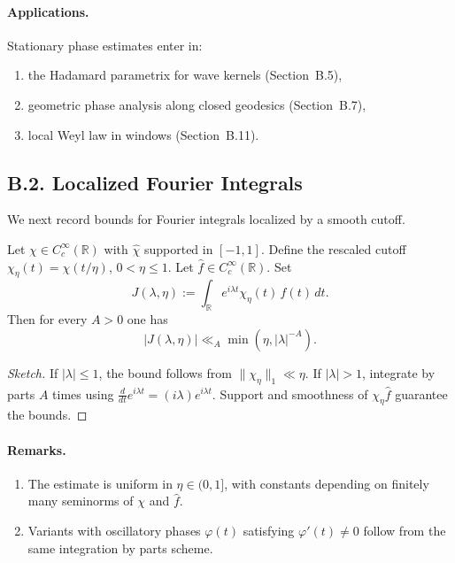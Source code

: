 \paragraph{Applications.}
Stationary phase estimates enter in:
\begin{enumerate}
  \item the Hadamard parametrix for wave kernels (Section~B.5),
  \item geometric phase analysis along closed geodesics (Section~B.7),
  \item local Weyl law in windows (Section~B.11).
\end{enumerate}



\subsection*{B.2. Localized Fourier Integrals}

We next record bounds for Fourier integrals localized by a smooth cutoff.

\begin{lemma}\label{lem:B2}
Let $\chi \in C_c^\infty(\mathbb R)$ with $\widehat\chi$ supported in $[-1,1]$.
Define the rescaled cutoff $\chi_\eta(t) = \chi(t/\eta)$, $0<\eta\le1$.
Let $\widehat f \in C_c^\infty(\mathbb R)$.  Set
\begin{equation}
  J(\lambda,\eta) := \int_{\mathbb R} e^{i \lambda t} \chi_\eta(t)\, \widehat f(t)\, dt.
\end{equation}
Then for every $A>0$ one has
\begin{equation}
  |J(\lambda,\eta)| \ll_A \min(\eta, |\lambda|^{-A}).
\end{equation}
\end{lemma}

\begin{proof}[Sketch]
If $|\lambda|\le 1$, the bound follows from $\|\chi_\eta\|_1\ll \eta$.  
If $|\lambda|>1$, integrate by parts $A$ times using 
$\tfrac{d}{dt} e^{i\lambda t} = (i\lambda) e^{i\lambda t}$.  
Support and smoothness of $\chi_\eta \widehat f$ guarantee the bounds.
\end{proof}

\paragraph{Remarks.}
\begin{enumerate}
  \item The estimate is uniform in $\eta\in(0,1]$, with constants depending on finitely many 
  seminorms of $\chi$ and $\widehat f$.
  \item Variants with oscillatory phases $\varphi(t)$ satisfying $\varphi'(t)\neq0$ 
  follow from the same integration by parts scheme.
\end{enumerate}

